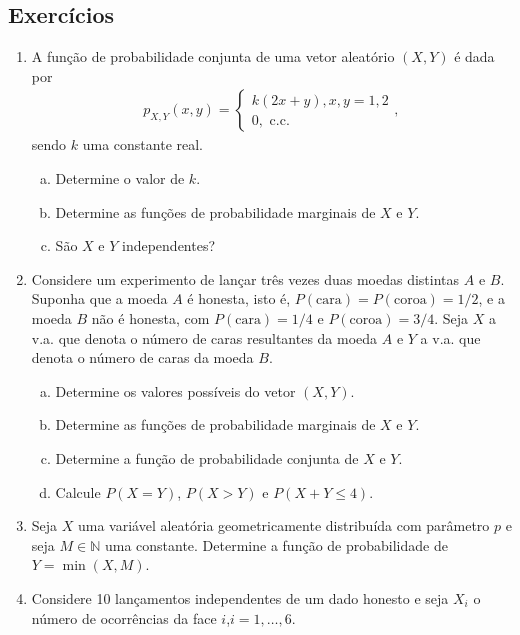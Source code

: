 \documentclass[../Notas.tex]{subfiles}
\begin{document}
\subsection{Exercícios}

\begin{enumerate}
    \item A função de probabilidade conjunta de uma vetor aleatório $(X,Y)$ é dada por
    \begin{align*}
        p_{X,Y}(x,y) = \begin{cases}
            k(2x+y), x,y = 1,2 \\
            0, \text{ c.c.}
        \end{cases},
    \end{align*}
    sendo $k$ uma constante real.
    \begin{enumerate}[a)]
        \item Determine o valor de $k$.
        \item Determine as funções de probabilidade marginais de $X$ e $Y$.
        \item São $X$ e $Y$ independentes?
    \end{enumerate}
    \item Considere um experimento de lançar três vezes duas moedas distintas $A$ e $B$. Suponha que a moeda $A$ é honesta, isto é, $P(\text{cara}) = P(\text{coroa}) = 1/2$, e a moeda $B$ não é honesta, com $P(\text{cara}) = 1/4$ e $P(\text{coroa}) = 3/4$. Seja $X$ a v.a. que denota o número de caras resultantes da moeda $A$ e $Y$ a v.a. que denota o número de caras da moeda $B$.
    \begin{enumerate}[a)]
        \item Determine os valores possíveis do vetor $(X,Y)$.
        \item Determine as funções de probabilidade marginais de $X$ e $Y$.
        \item Determine a função de probabilidade conjunta de $X$ e $Y$.
        \item Calcule $P(X=Y)$, $P(X>Y)$ e $P(X+Y\leq 4)$.
    \end{enumerate}
    \item Seja $X$ uma variável aleatória geometricamente distribuída com parâmetro $p$ e seja $M\in\mathbb{N}$ uma constante. Determine a função de probabilidade de $Y = \min(X,M)$.
    \item Considere 10 lançamentos independentes de um dado honesto e seja $X_i$ o número de ocorrências da face $i$,$i=1,\dots,6$.
    \begin{enumerate}[a)]

\end{enumerate}
\end{enumerate}
\end{document}
